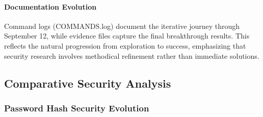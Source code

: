 \paragraph{Documentation Evolution}
Command logs (COMMANDS.log) document the iterative journey through September 12, while evidence files capture the final breakthrough results. This reflects the natural progression from exploration to success, emphasizing that security research involves methodical refinement rather than immediate solutions.

\subsection{Comparative Security Analysis}

\subsubsection{Password Hash Security Evolution}

